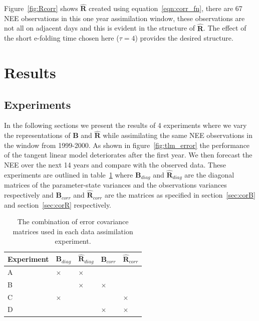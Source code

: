 \documentclass[11pt]{article}
\begin{document}
Figure~\ref{fig:Rcorr} shows $\hat{\mathbf{R}}$ created using equation~\ref{eqn:corr_fn}, there are 67 NEE observations in this one year assimilation window, these observations are not all on adjacent days and this is evident in the structure of $\hat{\mathbf{R}}$. The effect of the short e-folding time chosen here ($\tau=4$) provides the desired structure. 

\section{Results} \label{sec:results}

\subsection{Experiments} \label{sec:exps}

In the following sections we present the results of 4 experiments where we vary the representations of $\textbf{B}$ and $\hat{\mathbf{R}}$ while assimilating the same NEE observations in the window from 1999-2000. As shown in figure~\ref{fig:tlm_error} the performance of the tangent linear model deteriorates after the first year. We then forecast the NEE over the next 14 years and compare with the observed data. These experiments are outlined in table~\ref{table:exps_tab} where $\textbf{B}_{diag}$ and $\hat{\mathbf{R}}_{diag}$ are the diagonal matrices of the parameter-state variances and the observations variances respectively and $\textbf{B}_{corr}$ and $\hat{\mathbf{R}}_{corr}$ are the matrices as specified in section~\ref{sec:corB} and section~\ref{sec:corR} respectively.

\begin{table}[ht] 
\begin{center}
	\begin{tabular}{| l | l | l | l | l |}
	\hline
	Experiment & $\textbf{B}_{diag}$ & $\hat{\mathbf{R}}_{diag}$ & $\textbf{B}_{corr}$ &
	$\hat{\mathbf{R}}_{corr}$ \\ \hline
	A & $\times$ & $\times$ & & \\ \hline
	B & & $\times$ & $\times$ & \\ \hline
	C & $\times$ & & & $\times$ \\ \hline
	D & & & $\times$ & $\times$ \\ 
	\hline
	\end{tabular}
	\caption{The combination of error covariance matrices used in each data assimilation experiment.}
	\label{table:exps_tab}
\end{center} 
\end{table}
\end{document}
